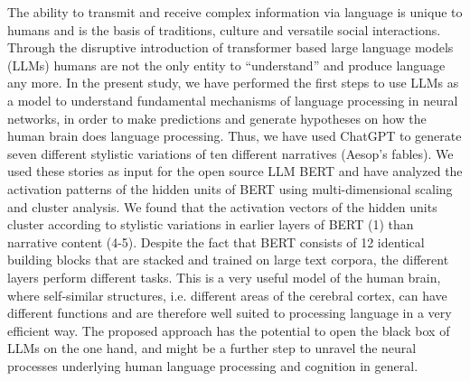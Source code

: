 The ability to transmit and receive complex information via language is unique to humans and is the basis of traditions, culture and versatile social interactions. Through the disruptive introduction of transformer based large language models (LLMs) humans are not the only entity to “understand” and produce language any more. In the present study, we have performed the first steps to use LLMs as a model to understand fundamental mechanisms of language processing in neural networks, in order to make predictions and generate hypotheses on how the human brain does language processing. Thus, we have used ChatGPT to generate seven different stylistic variations of ten different narratives (Aesop’s fables). We used these stories as input for the open source LLM BERT and have analyzed the activation patterns of the hidden units of BERT using multi-dimensional scaling and cluster analysis. We found that the activation vectors of the hidden units cluster according to stylistic variations in earlier layers of BERT (1) than narrative content (4-5). Despite the fact that BERT consists of 12 identical building blocks that are stacked and trained on large text corpora, the different layers perform different tasks. This is a very useful model of the human brain, where self-similar structures, i.e. different areas of the cerebral cortex, can have different functions and are therefore well suited to processing language in a very efficient way. The proposed approach has the potential to open the black box of LLMs on the one hand, and might be a further step to unravel the neural processes underlying human language processing and cognition in general.